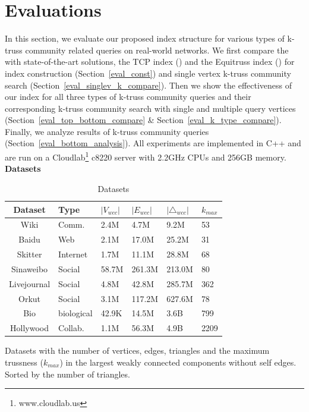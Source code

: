\section{Evaluations}
\label{evaluation}

In this section, we evaluate our proposed index structure for various types of k-truss community related queries on real-world networks. We first compare the \twolevelindex{} with state-of-the-art solutions, the TCP index (\cite{huang2014querying}) and the Equitruss index (\cite{akbas2017truss}) for index construction (Section~\ref{eval_const}) and single vertex k-truss community search (Section~\ref{eval_singlev_k_compare}). Then we show the effectiveness of our index for all three types of \toplevelprob{} k-truss community queries and their corresponding k-truss community search with single and multiple query vertices (Section~\ref{eval_top_bottom_compare} \& Section~\ref{eval_k_type_compare}). Finally, we analyze results of \bottomlevelprob{} k-truss community queries (Section~\ref{eval_bottom_analysis}). All experiments are implemented in C++ and are run on a Cloudlab\footnote{www.cloudlab.us} c8220 server with 2.2GHz CPUs and 256GB memory. 
\vskip 0.1in \noindent \textbf{Datasets} 

\begin{table}
\caption{Datasets}
\label{table:datasets} 
\begin{threeparttable}
	\centering
		\begin{tabularx}{\linewidth}{c|*{5}{Y}} 
		\toprule
			Dataset & Type & $|V_{wcc}|$ & $|E_{wcc}|$ & $|{\triangle}_{wcc}|$ & $k_{max}$ \\
			\midrule
			Wiki & Comm. & 2.4M & 4.7M & 9.2M & 53 \\ 
			Baidu & Web & 2.1M & 17.0M & 25.2M & 31 \\
			Skitter & Internet & 1.7M & 11.1M & 28.8M & 68 \\ 
			Sinaweibo & Social & 58.7M & 261.3M & 213.0M & 80 \\ 
			Livejournal & Social & 4.8M & 42.8M & 285.7M & 362 \\ 
			Orkut & Social & 3.1M & 117.2M & 627.6M & 78 \\
			Bio & biological & 42.9K & 14.5M & 3.6B & 799 \\
			Hollywood & Collab. & 1.1M & 56.3M & 4.9B & 2209 \\
			\bottomrule
			\end{tabularx}
			\begin{tablenotes}
				\item Datasets with the number of vertices, edges, triangles and the maximum trussness ($k_{max}$) in the largest weakly connected components without self edges. Sorted by the number of triangles.
			\end{tablenotes}
		\end{threeparttable}
\end{table}

